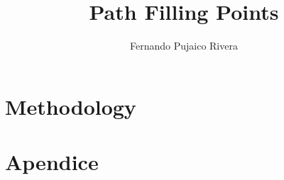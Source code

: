 \documentclass{book}
\title{Path Filling Points}
\author{Fernando Pujaico Rivera}
\begin{document}
\maketitle 

\tableofcontents

\chapter{Methodology}





\chapter{Apendice}



\printbibliography
\end{document}
